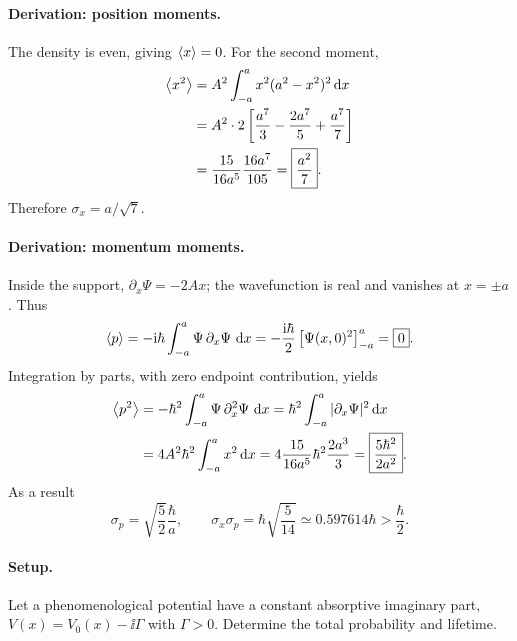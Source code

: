 \paragraph{Derivation: position moments.}
The density is even, giving $\left\langle x\right\rangle=0$. For the second moment,
\begin{align}
\left\langle x^2\right\rangle
&=A^2\int_{-a}^a x^2(a^2-x^2)^2\,\mathrm{d} x\\
&=A^2\cdot2\left[\frac{a^7}3-\frac{2a^7}5+\frac{a^7}7\right]\\
&=\frac{15}{16a^5}\frac{16a^7}{105}
=\boxed{\frac{a^2}{7}}.
\end{align}
Therefore $\boxed{\sigma_x=a/\sqrt7}$.
\paragraph{Derivation: momentum moments.}
Inside the support, $\partial_x\Psi=-2Ax$; the wavefunction is real and vanishes at $x=\pm a$. Thus
\begin{equation}
\left\langle p\right\rangle=-\mathrm{i}\hbar\int_{-a}^a\Psi\,\partial_x\Psi\,\,\mathrm{d} x
=-\frac{\mathrm{i}\hbar}{2}\left[\Psi(x,0)^2\right]_{-a}^a
=\boxed{0}.
\end{equation}
Integration by parts, with zero endpoint contribution, yields
\begin{align}
\left\langle p^2\right\rangle&=-\hbar^2\int_{-a}^a\Psi\,\partial_x^2\Psi\,\,\mathrm{d} x
=\hbar^2\int_{-a}^a|\partial_x\Psi|^2\,\mathrm{d} x\\
&=4A^2\hbar^2\int_{-a}^a x^2\,\mathrm{d} x
=4\frac{15}{16a^5}\hbar^2\frac{2a^3}{3}
=\boxed{\frac{5\hbar^2}{2a^2}}.
\end{align}
As a result
\begin{equation}
\boxed{\sigma_p=\sqrt{\frac52}\frac{\hbar}{a}},\qquad
\boxed{\sigma_x\sigma_p=\hbar\sqrt{\frac5{14}}
\simeq0.597614\hbar>\frac{\hbar}{2}.}
\end{equation}

\paragraph{Setup.} Let a phenomenological potential have a constant absorptive imaginary part,
$V(x)=V_0(x)-\ii\Gamma$ with $\Gamma>0$. Determine the total probability and lifetime.
